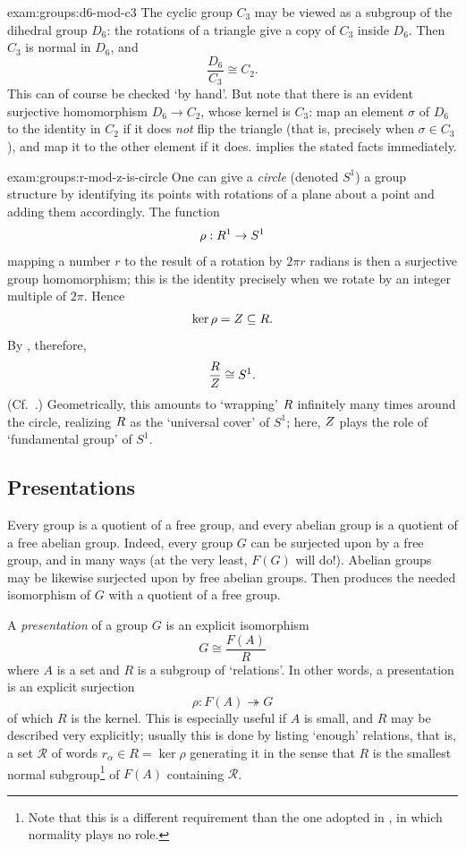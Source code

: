 \begin{exam}{}{exam:groups:d6-mod-c3}
  The cyclic group $C_3$ may be viewed as a subgroup of the dihedral
  group $D_6$: the rotations of a triangle give a copy of $C_3$ inside
  $D_6$. Then $C_3$ is normal in $D_6$, and
  \[
    \frac{D_6}{C_3} \cong C_2.
  \]
  This can of course be checked `by hand'. But note that there is an
  evident surjective homomorphism $D_6 \to C_2$, whose kernel is
  $C_3$: map an element $\sigma$ of $D_6$ to the identity in $C_2$ if
  it does \emph{not} flip the triangle (that is, precisely when
  $\sigma \in C_3$), and map it to the other element if it does.
   implies the
  stated facts immediately.
\end{exam}

\begin{exam}{}{exam:groups:r-mod-z-is-circle}
  One can give a \emph{circle} (denoted $S^1$) a group structure by
  identifying its points with rotations of a plane about a point and
  adding them accordingly. The function
  \[
    \rho : R^1 \to S^1
  \]
  mapping a number $r$ to the result of a rotation by $2\pi r$ radians
  is then a surjective group homomorphism; this is the identity
  precisely when we rotate by an integer multiple of $2\pi$. Hence
  \[
    \ker\rho = Z \subseteq R.
  \]
  By , therefore,
  \[
    \frac{R}{Z} \cong S^1.
  \] (Cf.\ .) Geometrically, this amounts to
  `wrapping' $R$ infinitely many times around the circle, realizing
  $R$ as the `universal cover' of $S^1$; here, $Z$ plays the role of
  `fundamental group' of $S^1$.
\end{exam}

\subsection{Presentations}
\label{subsec:groups:presentations}
Every group is a quotient of a free group, and every abelian group is
a quotient of a free abelian group. Indeed, every group $G$ can be
surjected upon by a free group, and in many ways (at the very least,
$F(G)$ will do!). Abelian groups may be likewise surjected upon by
free abelian groups. Then
 produces the
needed isomorphism of $G$ with a quotient of a free group.

A \emph{presentation} of a group $G$ is an explicit isomorphism
\[
  G \cong \frac{F(A)}{R}
\]
where $A$ is a set and $R$ is a subgroup of `relations'. In other
words, a presentation is an explicit surjection
\[
  \rho : F(A) \twoheadrightarrow G
\]
of which $R$ is the kernel. This is especially useful if $A$ is small,
and $R$ may be described very explicitly; usually this is done by
listing `enough' relations, that is, a set $\mathscr{R}$ of words
$r_\alpha \in R = \ker\rho$ generating it in the sense that $R$ is the
smallest normal subgroup\footnote{Note that this is a different
  requirement than the one adopted in
  , in
  which normality plays no role.} of $F(A)$ containing $\mathscr{R}$.

